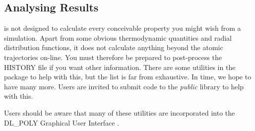 \subsection{Analysing Results}

\D{} is not designed to calculate every conceivable property you
might wish from a simulation. Apart from some obvious thermodynamic
quantities and radial distribution functions, it does not calculate
anything beyond the atomic trajectories on-line. You must therefore be
prepared to post-process the HISTORY file if you want other
information. There are some utilities in the \D{} package to help
with this, but the list is far from exhaustive. In time, we hope
to have many more. Users are invited to submit code to the \D{} {\em
public} library to help with this.

Users should be aware that many of these utilities are incorporated
into the DL\_POLY Graphical User Interface \cite{smith-gui}.
